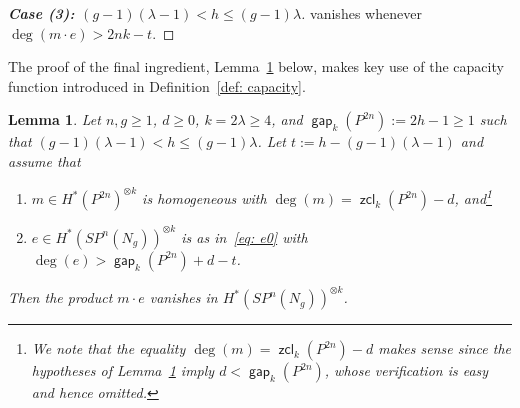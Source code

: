 \documentclass[amscd,amssymb,verbatim,10pt]{amsart}
\numberwithin{equation}{section}
\theoremstyle{plain}
\newtheorem{lemma}[thm]{Lemma}
\theoremstyle{definition}
\DeclareMathOperator{\zcl}{{\mathsf{zcl}}}
\DeclareMathOperator{\gap}{{\mathsf{gap}}}
\begin{document}
\begin{proof}[\textbf{Case (3): $(g-1)(\lambda-1)<h\le (g-1)\lambda$}]
vanishes whenever $\deg(m\cdot e)>2nk-t$.
\end{proof}

The proof of the final ingredient, Lemma~\ref{prop: final} below, makes key use of the capacity function introduced in Definition~\ref{def: capacity}.

\begin{lemma}\label{prop: final}
    Let $n,g\geq1$, $d\geq0$, $k=2\lambda\ge 4$, and $\gap_k(P^{2n}):=2h-1\geq1$ such that $(g-1)(\lambda-1)<h\le(g-1)\lambda$. Let $t:=h-(g-1)(\lambda-1)$ and assume that
\begin{enumerate}
        \item $m\in H^*(P^{2n})^{\otimes k}$ is homogeneous with $\deg(m)=\zcl_k(P^{2n})-d$, and\hspace{.5mm}\footnote{We note that the equality $\deg(m)=\zcl_k(P^{2n})-d$ makes sense since the hypotheses of Lemma~\ref{prop: final} imply $d<\gap_k(P^{2n})$, whose verification is easy and hence omitted.}
        \item  $e\in H^*(SP^n(N_g))^{\otimes k}$ is as in~\eqref{eq: e0} with $\deg(e)>\gap_k(P^{2n})+d-t$.
    \end{enumerate}
    Then the product $m\cdot e$ vanishes in $H^*(SP^n(N_g))^{\otimes k}$.
\end{lemma}
\end{document}
